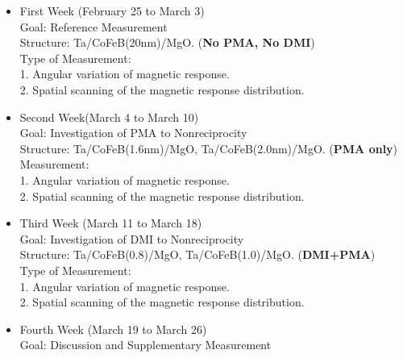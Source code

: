 \begin{itemize}
\item First Week (February 25 to March 3)
\\Goal: Reference Measurement
\\Structure: Ta/CoFeB(20nm)/MgO. (\textbf{No PMA, No DMI})
\\Type of Measurement:
\\1. Angular variation of magnetic response.
\\2. Spatial scanning of the magnetic response distribution.

\item Second Week(March 4 to March 10)
\\Goal: Investigation of PMA to Nonreciprocity
\\Structure: Ta/CoFeB(1.6nm)/MgO, Ta/CoFeB(2.0nm)/MgO. (\textbf{PMA only})
\\Measurement:
\\1. Angular variation of magnetic response.
\\2. Spatial scanning of the magnetic response distribution.

\item Third Week (March 11 to March 18)
\\Goal: Investigation of DMI to Nonreciprocity
\\Structure: Ta/CoFeB(0.8)/MgO, Ta/CoFeB(1.0)/MgO. (\textbf{DMI+PMA})
\\Type of Measurement:
\\1. Angular variation of magnetic response. 
\\2. Spatial scanning of the magnetic response distribution.



\item Fourth Week (March 19 to March 26)
\\Goal: Discussion and Supplementary Measurement

\end{itemize}



